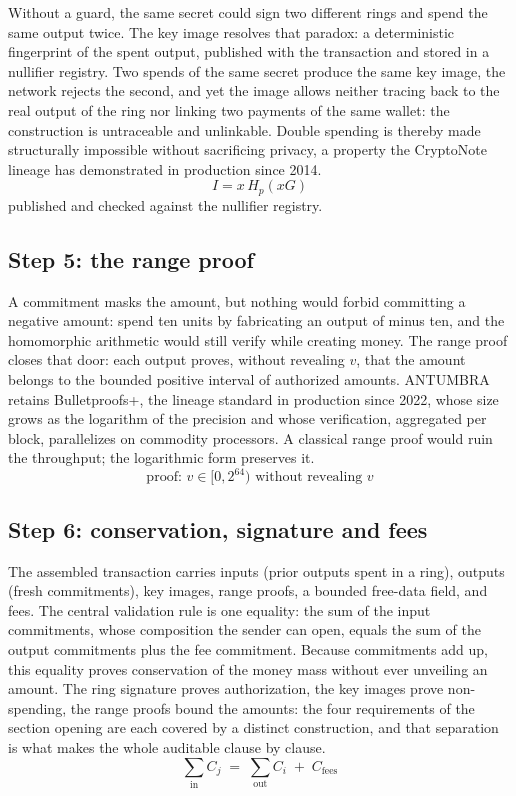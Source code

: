 Without a guard, the same secret could sign two different rings and spend
the same output twice. The key image resolves that paradox: a
deterministic fingerprint of the spent output, published with the
transaction and stored in a nullifier registry. Two spends of the same
secret produce the same key image, the network rejects the second, and yet
the image allows neither tracing back to the real output of the ring nor
linking two payments of the same wallet: the construction is untraceable
and unlinkable. Double spending is thereby made structurally impossible
without sacrificing privacy, a property the CryptoNote lineage has
demonstrated in production since 2014.
\begin{equation}\label{eq:keyimage}
I = x\,H_p(xG)
\end{equation}
published and checked against the nullifier registry.

\subsection{Step 5: the range proof}

A commitment masks the amount, but nothing would forbid committing a
negative amount: spend ten units by fabricating an output of minus ten,
and the homomorphic arithmetic would still verify while creating money.
The range proof closes that door: each output proves, without revealing
$v$, that the amount belongs to the bounded positive interval of
authorized amounts. ANTUMBRA retains Bulletproofs+, the lineage standard
in production since 2022, whose size grows as the logarithm of the
precision and whose
verification, aggregated per block, parallelizes on commodity processors.
A classical range proof would ruin the throughput; the logarithmic form
preserves it.
\begin{equation}\label{eq:range}
\text{proof: } v \in [0, 2^{64}) \text{ without revealing } v
\end{equation}

\subsection{Step 6: conservation, signature and fees}

The assembled transaction carries inputs (prior outputs spent in a ring),
outputs (fresh commitments), key images, range proofs, a bounded free-data
field, and fees. The central validation rule is one equality: the sum of
the input commitments, whose composition the sender can open, equals the
sum of the output commitments plus the fee commitment. Because commitments
add up, this equality proves conservation of the money mass without ever
unveiling an amount. The ring signature proves authorization, the key
images prove non-spending, the range proofs bound the amounts: the four
requirements of the section opening are each covered by a distinct
construction, and that separation is what makes the whole auditable
clause by clause.
\begin{equation}\label{eq:conservation}
\sum_{\mathrm{in}} C_j \;=\; \sum_{\mathrm{out}} C_i \;+\; C_{\mathrm{fees}}
\end{equation}

